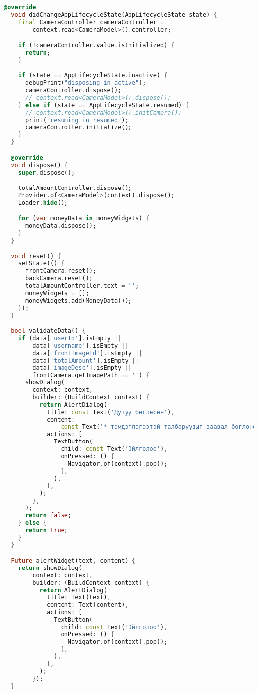 \begin{lstlisting}[language=Dart, caption=Дата цуглуулалтын логик хэрэгжүүлэлт, frame=single]
  @override
  void didChangeAppLifecycleState(AppLifecycleState state) {
    final CameraController cameraController =
        context.read<CameraModel>().controller;

    if (!cameraController.value.isInitialized) {
      return;
    }

    if (state == AppLifecycleState.inactive) {
      debugPrint("disposing in active");
      cameraController.dispose();
      // context.read<CameraModel>().dispose();
    } else if (state == AppLifecycleState.resumed) {
      // context.read<CameraModel>().initCamera();
      print("resuming in resumed");
      cameraController.initialize();
    }
  }

  @override
  void dispose() {
    super.dispose();

    totalAmountController.dispose();
    Provider.of<CameraModel>(context).dispose();
    Loader.hide();

    for (var moneyData in moneyWidgets) {
      moneyData.dispose();
    }
  }

  void reset() {
    setState(() {
      frontCamera.reset();
      backCamera.reset();
      totalAmountController.text = '';
      moneyWidgets = [];
      moneyWidgets.add(MoneyData());
    });
  }

  bool validateData() {
    if (data['userId'].isEmpty ||
        data['username'].isEmpty ||
        data['frontImageId'].isEmpty ||
        data['totalAmount'].isEmpty ||
        data['imageDesc'].isEmpty ||
        frontCamera.getImagePath == '') {
      showDialog(
        context: context,
        builder: (BuildContext context) {
          return AlertDialog(
            title: const Text('Дутуу бөглөсөн'),
            content:
                const Text('* тэмдэглэгээтэй талбаруудыг заавал бөглөнө үү'),
            actions: [
              TextButton(
                child: const Text('Ойлголоо'),
                onPressed: () {
                  Navigator.of(context).pop();
                },
              ),
            ],
          );
        },
      );
      return false;
    } else {
      return true;
    }
  }

  Future alertWidget(text, content) {
    return showDialog(
        context: context,
        builder: (BuildContext context) {
          return AlertDialog(
            title: Text(text),
            content: Text(content),
            actions: [
              TextButton(
                child: const Text('Ойлголоо'),
                onPressed: () {
                  Navigator.of(context).pop();
                },
              ),
            ],
          );
        });
  }


\end{lstlisting}
